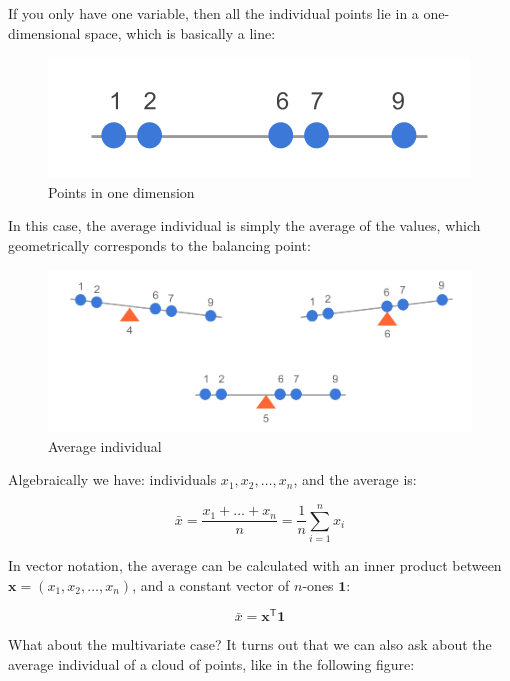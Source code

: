 \documentclass[]{book}
\begin{document}
If you only have one variable, then all the individual points lie in a one-dimensional space, which is basically a line:

\begin{figure}

{\centering \includegraphics[width=0.3\linewidth]{images/duality/mean-number-line} 

}

\caption{Points in one dimension}\label{fig:unnamed-chunk-11}
\end{figure}

In this case, the average individual is simply the average of the values, which geometrically corresponds to the balancing point:

\begin{figure}

{\centering \includegraphics[width=0.7\linewidth]{images/duality/mean-balancing} 

}

\caption{Average individual}\label{fig:unnamed-chunk-12}
\end{figure}

Algebraically we have: individuals \(x_1, x_2, \dots, x_n\), and the average is:

\[
\bar{x} = \frac{x_1 + \dots + x_n}{n} = \frac{1}{n} \sum_{i=1}^{n} x_i
\]

In vector notation, the average can be calculated with an inner product between \(\mathbf{x} = (x_1, x_2, \dots, x_n)\), and a constant vector of \(n\)-ones \(\mathbf{1}\):

\[
\bar{x} = \mathbf{x^\mathsf{T}1}
\]

What about the multivariate case? It turns out that we can also ask about the average individual of a cloud of points, like in the following figure:
\end{document}
